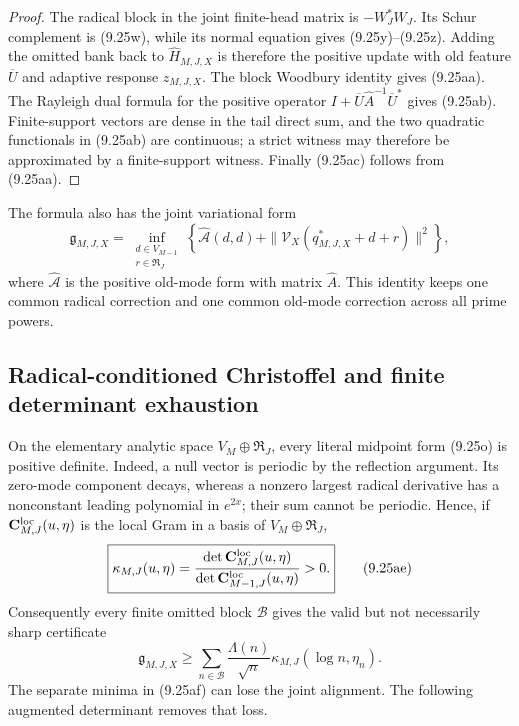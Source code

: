 \documentclass[11pt]{amsart}
\theoremstyle{definition}
\theoremstyle{remark}
\begin{document}
\begin{proof}
The radical block in the joint finite-head matrix is
\(-W_J^*W_J\).  Its Schur complement is (9.25w), while its normal
equation gives (9.25y)--(9.25z).  Adding the omitted bank back to
\(\widehat H_{M,J,X}\) is therefore the positive update with old feature
\(\overline U\) and adaptive response \(z_{M,J,X}\).  The block Woodbury
identity gives (9.25aa).  The Rayleigh dual formula for the positive
operator \(I+\overline U\widehat A^{-1}\overline U^*\) gives (9.25ab).
Finite-support vectors are dense in the tail direct sum, and the two
quadratic functionals in (9.25ab) are continuous; a strict witness may
therefore be approximated by a finite-support witness.  Finally
(9.25ac) follows from (9.25aa).
\end{proof}

The formula also has the joint variational form
\[
 \boxed{
 \mathfrak g_{M,J,X}
 =\inf_{\substack{d\in V_{M-1}\\r\in\mathfrak R_J}}
 \left\{\widehat{\mathcal A}(d,d)
 +\|\mathcal V_X(q_{M,J,X}^*+d+r)\|^2\right\},}
\tag{9.25ad}
\]
where \(\widehat{\mathcal A}\) is the positive old-mode form with matrix
\(\widehat A\).  This identity keeps one common radical correction and
one common old-mode correction across all prime powers.

\subsection{Radical-conditioned Christoffel and finite determinant
exhaustion}

On the elementary analytic space \(V_M\oplus\mathfrak R_J\), every
literal midpoint form (9.25o) is positive definite.  Indeed, a null
vector is periodic by the reflection argument.  Its zero-mode component
decays, whereas a nonzero largest radical derivative has a nonconstant
leading polynomial in \(e^{2x}\); their sum cannot be periodic.  Hence,
if \(\mathbf C_{M,J}^{\rm loc}(u,\eta)\) is the local Gram in a basis of
\(V_M\oplus\mathfrak R_J\),
\[
 \boxed{
 \kappa_{M,J}(u,\eta)
 =\frac{\det\mathbf C_{M,J}^{\rm loc}(u,\eta)}
        {\det\mathbf C_{M-1,J}^{\rm loc}(u,\eta)}>0.}
\tag{9.25ae}
\]
Consequently every finite omitted block \(\mathcal B\) gives the valid
but not necessarily sharp certificate
\[
 \mathfrak g_{M,J,X}\ge
 \sum_{n\in\mathcal B}\frac{\Lambda(n)}{\sqrt n}
 \kappa_{M,J}(\log n,\eta_n).
\tag{9.25af}
\]
The separate minima in (9.25af) can lose the joint alignment.  The
following augmented determinant removes that loss.
\end{document}
